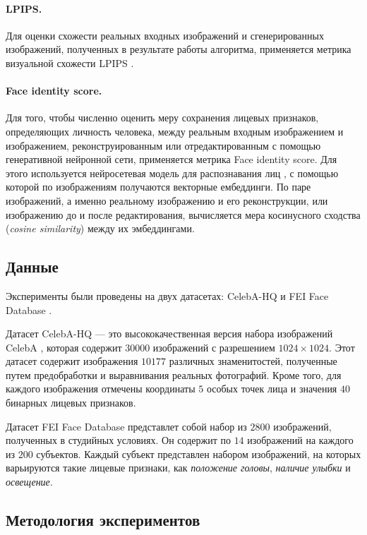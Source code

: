 \paragraph{LPIPS.}
Для оценки схожести реальных входных изображений и сгенерированных изображений, полученных в результате работы алгоритма, применяется метрика визуальной схожести LPIPS \cite{zhang2018lpips}.

\paragraph{Face identity score.}
Для того, чтобы численно оценить меру сохранения лицевых признаков, определяющих личность человека, между реальным входным изображением и изображением, реконструированным или отредактированным с помощью генеративной нейронной сети, применяется метрика Face identity score.
Для этого используется нейросетевая модель для распознавания лиц \cite{deng2018arcface}, с помощью которой по изображениям получаются векторные ембеддинги.
По паре изображений, а именно реальному изображению и его реконструкции, или изображению до и после редактирования, вычисляется мера косинусного сходства (\emph{cosine similarity}) между их эмбеддингами.


\subsection{Данные}
Эксперименты были проведены на двух датасетах: CelebA-HQ \cite{progressive-growing-gan} и FEI Face Database \cite{fei-database}.

Датасет CelebA-HQ --- это высококачественная версия набора изображений CelebA \cite{liu2015celeba}, которая содержит $30000$ изображений с разрешением $1024\times1024$.
Этот датасет содержит изображения $10177$ различных знаменитостей, полученные путем предобработки и выравнивания реальных фотографий.
Кроме того, для каждого изображения отмечены координаты $5$ особых точек лица и значения $40$ бинарных лицевых признаков.

Датасет FEI Face Database представлет собой набор из $2800$ изображений, полученных в студийных условиях.
Он содержит по $14$ изображений на каждого из $200$ субъектов.
Каждый субъект представлен набором изображений, на которых варьируются такие лицевые признаки, как \emph{положение головы}, \emph{наличие улыбки} и \emph{освещение}.


\subsection{Методология экспериментов}
